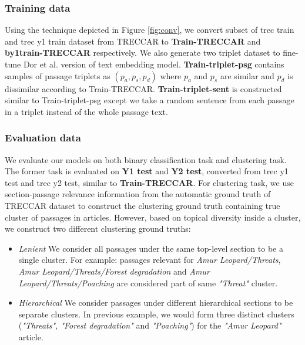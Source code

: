
\subsubsection{Training data} Using the technique depicted in Figure \ref{fig:conv}, we convert subset of trec train and trec y1 train dataset from TRECCAR to \textbf{Train-TRECCAR} and \textbf{by1train-TRECCAR} respectively. We also generate two triplet dataset to fine-tune Dor et al. version of text embedding model. \textbf{Train-triplet-psg} contains samples of passage triplets as $(p_a, p_s, p_d)$ where $p_a$ and $p_s$ are similar and $p_d$ is dissimilar according to Train-TRECCAR. \textbf{Train-triplet-sent} is constructed similar to Train-triplet-psg except we take a random sentence from each passage in a triplet instead of the whole passage text. 

\subsubsection{Evaluation data} We evaluate our models on both binary classification task and clustering task. The former task is evaluated on \textbf{Y1 test} and \textbf{Y2 test}, converted from trec y1 test and trec y2 test, similar to \textbf{Train-TRECCAR}. For clustering task, we use section-passage relevance information from the automatic ground truth of TRECCAR dataset to construct the clustering ground truth containing true cluster of passages in articles. However, based on topical diversity inside a cluster, we construct two different clustering ground truths:

\begin{itemize}
    \item \textit{Lenient} We consider all passages under the same top-level section to be a single cluster. For example: passages relevant for \textit{Amur Leopard/Threats}, \textit{Amur Leopard/Threats/Forest degradation} and \textit{Amur Leopard/Threats/Poaching} are considered part of same \textit{"Threat"} cluster.
    \item \textit{Hierarchical} We consider passages under different hierarchical sections to be separate clusters. In previous example, we would form three distinct clusters (\textit{"Threats", "Forest degradation"} and \textit{"Poaching"}) for the \textit{"Amur Leopard"} article.
\end{itemize}

